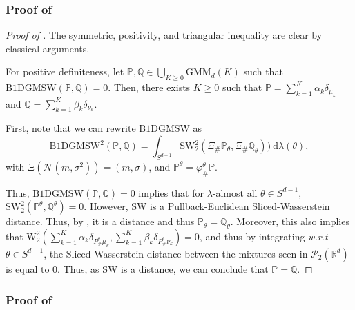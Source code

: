 \documentclass[twoside]{article}
\newcommand{\cP}{\mathcal{P}}
\newcommand{\bP}{\mathbb{P}}
\newcommand{\bQ}{\mathbb{Q}}
\newcommand{\cN}{\mathcal{N}}
\newcommand{\W}{\mathrm{W}}
\newcommand{\R}{\mathbb{R}}
\newcommand{\sw}{\mathrm{SW}}
\newcommand{\smwbdg}{\mathrm{B1DGMSW}}
\begin{document}
\subsubsection{Proof of } \label{proof:prop_bdgmsw_distance}

\begin{proof}[Proof of ]
    The symmetric, positivity, and triangular inequality are clear by classical arguments.

    For positive definiteness, let $\bP,\bQ \in \bigcup_{K\ge 0} \mathrm{GMM}_d(K)$ such that $\smwbdg(\bP,\bQ)=0$. Then, there exists $K\ge 0$ such that $\bP=\sum_{k=1}^K \alpha_k \delta_{\mu_k}$ and $\bQ=\sum_{k=1}^K \beta_k \delta_{\nu_k}$. 
    
    First, note that we can rewrite $\smwbdg$ as 
    \begin{equation}
        \smwbdg^2(\bP,\bQ)=\int_{S^{d-1}} \sw_2^2(\Xi_\#\bP_\theta,\Xi_\#\bQ_\theta)\big)\ \mathrm{d}\lambda(\theta),
    \end{equation}
    with $\Xi(\cN(m,\sigma^2))=(m,\sigma)$, and $\bP^\theta=\varphi^\theta_\#\bP$.
    
    Thus, $\smwbdg(\bP,\bQ)=0$ implies that for $\lambda$-almost all $\theta\in S^{d-1}$, $\sw_2^2(\bP^\theta, \bQ^\theta)=0$. However, $\sw$ is a Pullback-Euclidean Sliced-Wasserstein distance. Thus, by \citep[Proposition 26]{bonet2025sliced}, it is a distance and thus $\bP_\theta=\bQ_\theta$. Moreover, this also implies that $\W_2^2(\sum_{k=1}^K \alpha_k \delta_{P^\theta_\#\mu_k}, \sum_{k=1}^K \beta_k \delta_{P^\theta_\#\nu_k})=0$, and thus by integrating \emph{w.r.t} $\theta\in S^{d-1}$, the Sliced-Wasserstein distance between the mixtures seen in $\cP_2(\R^d)$ is equal to 0. Thus, as SW is a distance, we can conclude that $\bP=\bQ$.
\end{proof}




\subsubsection{Proof of } \label{proof:prop_extension_1dgaussian_ray}
\end{document}
